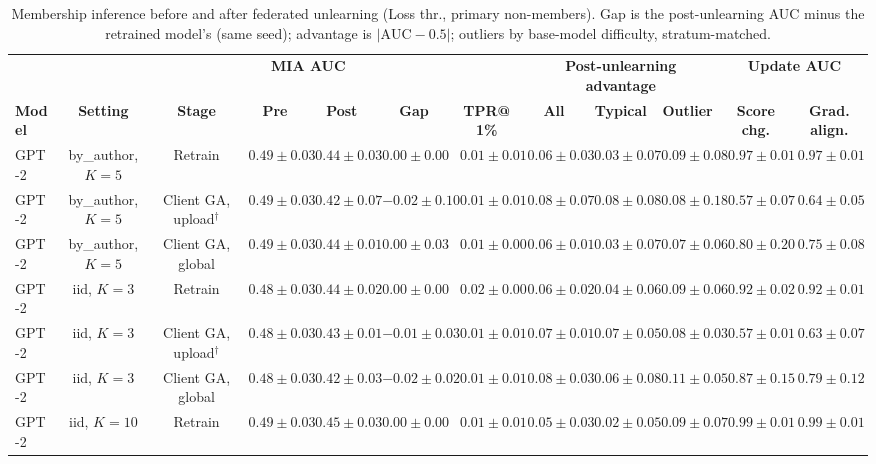 \begin{table}[t]
\centering
\caption{Membership inference before and after federated unlearning (Loss thr., primary non-members). Gap is the post-unlearning AUC minus the retrained model's (same seed); advantage is $|\mathrm{AUC}-0.5|$; outliers by base-model difficulty, stratum-matched.}
\label{tab:federated-loss-threshold-primary}
\footnotesize
\renewcommand{\arraystretch}{1.2}
\setlength{\tabcolsep}{2pt}
\begin{tabular*}{\textwidth}{@{\extracolsep{\fill}}lccccccccccc@{}}
\toprule
 & & & \multicolumn{2}{c}{\textbf{MIA AUC}} & & & \multicolumn{3}{c}{\textbf{Post-unlearning advantage}} & \multicolumn{2}{c}{\textbf{Update AUC}} \\
\cmidrule(lr){4-5}\cmidrule(lr){8-10}\cmidrule(lr){11-12}
\textbf{Model} & \textbf{Setting} & \textbf{Stage} & \textbf{Pre} & \textbf{Post} & \textbf{Gap} & \textbf{TPR@1\%} & \textbf{All} & \textbf{Typical} & \textbf{Outlier} & \textbf{Score chg.} & \textbf{Grad. align.} \\
\midrule
GPT-2 & by\_author, $K=5$ & Retrain & $0.49 \pm 0.03$ & $0.44 \pm 0.03$ & $0.00 \pm 0.00$ & $0.01 \pm 0.01$ & $0.06 \pm 0.03$ & $0.03 \pm 0.07$ & $0.09 \pm 0.08$ & $0.97 \pm 0.01$ & $0.97 \pm 0.01$ \\
GPT-2 & by\_author, $K=5$ & Client GA, upload$^{\dagger}$ & $0.49 \pm 0.03$ & $0.42 \pm 0.07$ & $-0.02 \pm 0.10$ & $0.01 \pm 0.01$ & $0.08 \pm 0.07$ & $0.08 \pm 0.08$ & $0.08 \pm 0.18$ & $0.57 \pm 0.07$ & $0.64 \pm 0.05$ \\
GPT-2 & by\_author, $K=5$ & Client GA, global & $0.49 \pm 0.03$ & $0.44 \pm 0.01$ & $0.00 \pm 0.03$ & $0.01 \pm 0.00$ & $0.06 \pm 0.01$ & $0.03 \pm 0.07$ & $0.07 \pm 0.06$ & $0.80 \pm 0.20$ & $0.75 \pm 0.08$ \\
GPT-2 & iid, $K=3$ & Retrain & $0.48 \pm 0.03$ & $0.44 \pm 0.02$ & $0.00 \pm 0.00$ & $0.02 \pm 0.00$ & $0.06 \pm 0.02$ & $0.04 \pm 0.06$ & $0.09 \pm 0.06$ & $0.92 \pm 0.02$ & $0.92 \pm 0.01$ \\
GPT-2 & iid, $K=3$ & Client GA, upload$^{\dagger}$ & $0.48 \pm 0.03$ & $0.43 \pm 0.01$ & $-0.01 \pm 0.03$ & $0.01 \pm 0.01$ & $0.07 \pm 0.01$ & $0.07 \pm 0.05$ & $0.08 \pm 0.03$ & $0.57 \pm 0.01$ & $0.63 \pm 0.07$ \\
GPT-2 & iid, $K=3$ & Client GA, global & $0.48 \pm 0.03$ & $0.42 \pm 0.03$ & $-0.02 \pm 0.02$ & $0.01 \pm 0.01$ & $0.08 \pm 0.03$ & $0.06 \pm 0.08$ & $0.11 \pm 0.05$ & $0.87 \pm 0.15$ & $0.79 \pm 0.12$ \\
GPT-2 & iid, $K=10$ & Retrain & $0.49 \pm 0.03$ & $0.45 \pm 0.03$ & $0.00 \pm 0.00$ & $0.01 \pm 0.01$ & $0.05 \pm 0.03$ & $0.02 \pm 0.05$ & $0.09 \pm 0.07$ & $0.99 \pm 0.01$ & $0.99 \pm 0.01$ \\

\end{tabular*}
\end{table}
